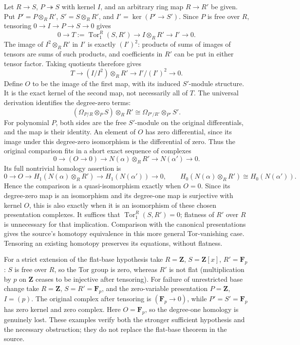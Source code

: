 Let \(R\to S\), \(P\twoheadrightarrow S\) with kernel \(I\), and an arbitrary ring map \(R\to R'\) be given. Put \(P'=P\otimes_R R'\), \(S'=S\otimes_R R'\), and \(I'=\ker(P'\to S')\). Since \(P\) is free over \(R\), tensoring \(0\to I\to P\to S\to0\) gives \[
0\to T:=\operatorname{Tor}_1^R(S,R')
\longrightarrow I\otimes_R R'\longrightarrow I'\longrightarrow0.
\] The image of \(I^2\otimes_R R'\) in \(I'\) is exactly \((I')^2\): products of sums of images of tensors are sums of such products, and coefficients in \(R'\) can be put in either tensor factor. Taking quotients therefore gives \[
T\longrightarrow (I/I^2)\otimes_R R'\longrightarrow I'/(I')^2\longrightarrow0.
\] Define \(O\) to be the image of the first map, with its induced \(S'\)-module structure. It is the exact kernel of the second map, not necessarily all of \(T\). The universal derivation identifies the degree-zero terms: \[
(\Omega_{P/R}\otimes_P S)\otimes_R R'
\cong\Omega_{P'/R'}\otimes_{P'}S'.
\] For polynomial \(P\), both sides are the free \(S'\)-module on the original differentials, and the map is their identity. An element of \(O\) has zero differential, since its image under this degree-zero isomorphism is the differential of zero. Thus the original comparison fits in a short exact sequence of complexes \[
0\to (O\to0)\to N(\alpha)\otimes_R R'\to N(\alpha')\to0.
\] Its full nontrivial homology assertion is \[
0\to O\to H_1(N(\alpha)\otimes_R R')
\to H_1(N(\alpha'))\to0,
\qquad H_0(N(\alpha)\otimes_R R')\cong H_0(N(\alpha')).\tag{5}
\] Hence the comparison is a quasi-isomorphism exactly when \(O=0\). Since its degree-zero map is an isomorphism and its degree-one map is surjective with kernel \(O\), this is also exactly when it is an isomorphism of these chosen presentation complexes. It suffices that \(\operatorname{Tor}_1^R(S,R')=0\); flatness of \(R'\) over \(R\) is unnecessary for that implication. Comparison with the canonical presentations gives the source's homotopy equivalence in this more general Tor-vanishing case. Tensoring an existing homotopy preserves its equations, without flatness.

For a strict extension of the flat-base hypothesis take \(R=\mathbf Z\), \(S=\mathbf Z[x]\), \(R'=\mathbf F_p\): \(S\) is free over \(R\), so the Tor group is zero, whereas \(R'\) is not flat (multiplication by \(p\) on \(\mathbf Z\) ceases to be injective after tensoring). For failure of unrestricted base change take \(R=\mathbf Z\), \(S=R'=\mathbf F_p\), and the zero-variable presentation \(P=\mathbf Z\), \(I=(p)\). The original complex after tensoring is \((\mathbf F_p\to0)\), while \(P'=S'=\mathbf F_p\) has zero kernel and zero complex. Here \(O=\mathbf F_p\), so the degree-one homology is genuinely lost. These examples verify both the stronger sufficient hypothesis and the necessary obstruction; they do not replace the flat-base theorem in the source.

